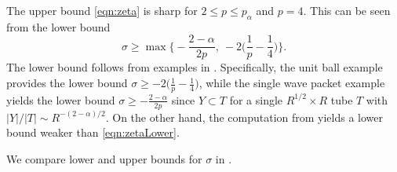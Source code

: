 \documentclass[11pt]{amsart}
\theoremstyle{definition}
\theoremstyle{remark}
\begin{document}
The upper bound \eqref{eqn:zeta} is  sharp for $2\leq p\leq p_\alpha$ and $p=4$. This can be seen from the lower bound
\begin{equation}\label{eqn:zetaLower}
\sigma \geq \max \Big\{ -\frac{2-\alpha}{2p},~ -2\big( \frac{1}{p}-\frac{1}{4} \big) \Big\}.
\end{equation}
The lower bound follows from examples in . Specifically, the unit ball example provides the lower bound $\sigma \geq -2\big( \frac{1}{p}-\frac{1}{4}\big)$, while the single wave packet example yields the lower bound $\sigma \geq  -\frac{2-\alpha}{2p}$ since $Y\subset T$ for a single $R^{1/2}\times R$ tube $T$ with $|Y|/|T| \sim R^{-(2-\alpha)/2}$. On the other hand, the computation from  yields a lower bound weaker than \eqref{eqn:zetaLower}. 

We compare lower and upper bounds for $\sigma$ in .
\end{document}
